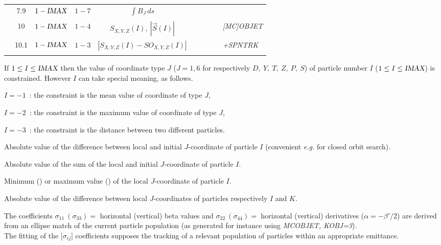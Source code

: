 {\begin{center}
{\begin{tabular}{|>{\bfseries}p{\LL}|c|c|c|c|c|c|c|c|p{\LL}|}
			\multicolumn{1}{|c|}{\textbf{  }}
			    & 7.9 & $1 - \textsl{IMAX}$ & $1 - 7$  & $\int B_J \, ds$ & &  & &  \\
                            & & & & & & & & &  \\
%
			\multicolumn{1}{|c|}{\textbf{Spin}}
			    & 10 & $1 - \textsl{IMAX}$ & $1 - 4$  & $  S_{X,Y,Z}(I), ~ |\vec S(I)| $  
         & & & & & \textsl{[MC]OBJET}   \\
			\multicolumn{1}{|c|}{\textbf{  }}
			    & 10.1 & $1 -\textsl{IMAX}$ & $1 -3$  &$|S_{X,Y,Z}(I) -SO_{X,Y,Z}(I)|$
         & & & & & \textsl{+SPNTRK}   \\
                            & & & & & & & & &  \\
			\hline
			\hline
		\end{tabular}  }
	\end{center}
} %




\smallskip

 If $1\leq I\leq \textsl{IMAX}$ then the value of coordinate type $J$ ($J=1,6$ for respectively 
 $D,~Y,~T,~Z,~P,~S$) of particle number $I$ ($1\leq I\leq \textsl{IMAX}$) is constrained.  However $I$ can take 
special meaning, as follows. 

$I=-1$~:  the constraint is the mean value of coordinate of type $J$, 

$I=-2$~:  the constraint is the maximum  value of coordinate of type $J$, 

$I=-3$~:  the constraint is the distance between two different particles. 

\smallskip

 Absolute value of the difference between local and initial $J$-coordinate of particle $I$ (convenient 
\emph{e.g.} for closed orbit search). 

 Absolute value of the sum of the local and initial $J$-coordinate of particle $I$.

 Minimum () or maximum value () of the local $J$-coordinate of particle $I$.

 Absolute value of the difference between local $J$-coordinates of particles respectively 
 $I$ and $K$.

\smallskip

 The coefficients 
$ \sigma_{11}~(\sigma_{ 33}) = $ horizontal (vertical) beta values and 
$ \sigma_{ 22}~(\sigma_{ 44}) = $ horizontal (vertical) derivatives ($\alpha = -\beta'/2$) 
are derived from an ellipse match of the current particle population (as generated for instance using 
\textsl{MCOBJET, KOBJ=3}).\\
%
The fitting of the $ \lbrack \sigma_{ij}\rbrack $ 
coefficients supposes the tracking of a relevant population of particles within an 
appropriate emittance.  

